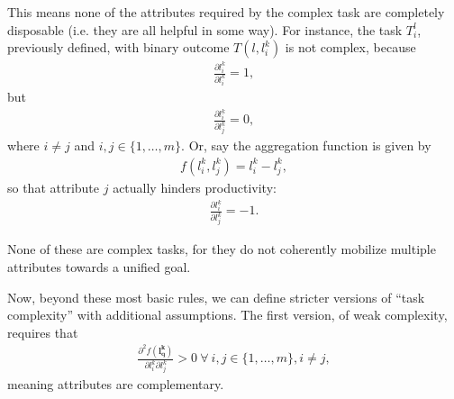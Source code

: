 {\begin{definition}
        This means none of the attributes required by the complex task are completely disposable (i.e. they are all helpful in some way). For instance, the task $T_{i}^{l}$, previously defined, with binary outcome $T(l, l_{i}^{k})$ is not complex, because
        \begin{gather}
            \frac{
                \partial
                l_{i}^{k}
            }{
                \partial 
                l_{i}^{k}
            } = 1
            ,
        \end{gather}
        but
        \begin{gather}
            \frac{
                \partial
                l_{i}^{k}
            }{
                \partial 
                l_{j}^{k}
            } = 0
            , 
        \end{gather}
        where $i \neq j$ and $i, j \in \{1, \dots, m\}$. Or, say the aggregation function is given by
        \begin{gather}
            f(l_{i}^{k}, l_{j}^{k}) = 
            l_{i}^{k} - l_{j}^{k}
            ,
        \end{gather}
        so that attribute $j$ actually hinders productivity:
        \begin{gather}
            \frac{
                \partial
                l_{i}^{k}
            }{
                \partial 
                l_{j}^{k}
            } = -1
            .
        \end{gather}
            
        None of these are complex tasks, for they do not coherently mobilize multiple attributes towards a unified goal.
        
        \begin{subdefinition}
            Now, beyond these most basic rules, we can define stricter versions of ``task complexity'' with additional assumptions. The first version, of weak complexity, requires that
            \begin{gather}
                \frac{
                    \partial ^ 2 {f(\boldsymbol{l_{q}^{k}})}
                }{
                    \partial 
                    l_{i}^{k}
                    \partial
                    l_{j}^{k}
                }
                > 0
                \
                \forall
                \
                i, j \in \{1, \dots, m\}
                ,
                i \neq j
                ,
            \end{gather}
            meaning attributes are complementary.
        \end{subdefinition}
        

\end{definition}}
